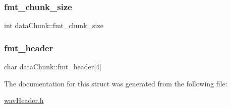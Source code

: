 \subsubsection{\texorpdfstring{fmt\+\_\+chunk\+\_\+size}{fmt\_chunk\_size}}
{\footnotesize\ttfamily int data\+Chunk\+::fmt\+\_\+chunk\+\_\+size}

\mbox{\label{structdataChunk_a846343045c6f7168e969f3a4f19a44e1}} 
\subsubsection{\texorpdfstring{fmt\+\_\+header}{fmt\_header}}
{\footnotesize\ttfamily char data\+Chunk\+::fmt\+\_\+header\mbox{[}4\mbox{]}}



The documentation for this struct was generated from the following file\+:\begin{DoxyCompactItemize}
\item 
\hyperlink{wavHeader_8h}{wav\+Header.\+h}\end{DoxyCompactItemize}
